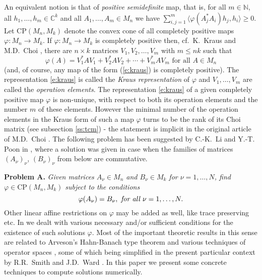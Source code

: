 \documentclass[12pt]{amsart}
\theoremstyle{definition}
\let\phi=\varphi
\begin{document}
An equivalent notion is that of 
\emph{positive semidefinite} map, 
that is, for all $m\in{{\mathbb N}}$, all $h_1,\ldots,h_m\in {{\mathbb C}}^k$ and all 
$A_1,\ldots,A_m\in M_n$ we have
$\sum_{i,j=1}^m \langle \phi(A_j^*A_i)h_j,h_i\rangle  \geq 0$.
Let $\mathrm{CP}
(M_n,M_k)$ 
 denote the convex cone of all completely positive maps $\phi\colon M_n{\rightarrow} M_k$. 
If $\phi:M_n\rightarrow M_k$ is completely 
positive then, cf.\ K.~Kraus \cite{Kra71} and M.D.~Choi \cite{Choi}, 
there are $n\times k$ matrices 
$V_1,V_2,\ldots,V_m$ with $m\leq nk$ such that
\begin{equation}\label{e:kraus}
\phi(A)=V_1^*AV_1+V_2^*AV_2+\cdots +V_m^*AV_m \mbox{ for all }
A\in M_n
\end{equation}
(and, of course, any map of the form (\ref{e:kraus}) is completely positive).
The representation \eqref{e:kraus} is called the \emph{Kraus representation} of 
$\phi$ and  $V_1,\dots,V_m$ are called the \emph{operation elements}. 
The representation \eqref{e:kraus} of a given completely positive 
map $\phi$ is  non-unique, with respect to both its operation 
elements and the number $m$ of these elements.
However the minimal number of the operation elements in the Kraus 
form of such a map $\varphi$ turns to be the rank of its Choi matrix (see subsection \ref{ss:tcm})  
- the statement is implicit in the original article of M.D.~Choi 
\cite{Choi}.
 The following problem has been
suggested by C.-K.~Li and Y.-T. Poon in \cite{LiPoon}, 
where a solution was given  in case when the  
families of matrices $(A_\nu )_\nu$, $(B_\nu )_\nu$ from below are commutative.

\noindent\textbf{Problem A.} \emph{
Given matrices $A_\nu \in M_n$ and $B_\nu \in M_k$ for $\nu =1,\ldots ,N$, 
find
$\phi \in\mathrm{CP}(M_n ,M_k)$ subject to the conditions}
\begin{equation}\label{e:princ}\varphi(A_\nu) =B_\nu,\mbox{ \it for all }\nu=1,\ldots,N.
\end{equation}
Other linear affine restrictions on $\varphi$ may be added as well, 
like trace preserving etc.
In \cite{prima} we dealt with various necessary and/or sufficient  conditions for the 
existence of such solutions $\phi$.
Most of the important theoretic results in this sense are related to  Arveson's 
Hahn-Banach type theorem \cite{Arveson} and
various techniques of operator spaces  \cite{Pau},
some of which being  simplified in the present particular context  by R.R.~Smith 
and J.D.~Ward \cite{SmithWard}. In this  paper we present some concrete techniques  to  compute  solutions numerically.
\vspace{2 mm}
\end{document}
